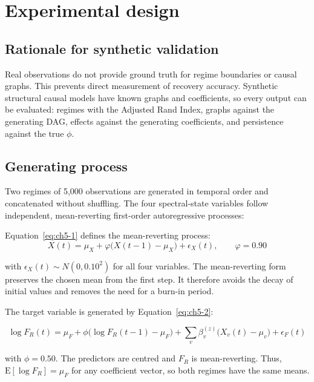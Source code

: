 

\section{Experimental design}


\subsection{Rationale for synthetic validation}

Real observations do not provide ground truth for regime boundaries or causal graphs.
This prevents direct measurement of recovery accuracy. Synthetic structural causal
models have known graphs and coefficients, so every output can be evaluated: regimes
with the Adjusted Rand Index, graphs against the generating DAG, effects against the
generating coefficients, and persistence against the true $\phi$.


\subsection{Generating process}

Two regimes of 5,000 observations are generated in temporal order and concatenated
without shuffling. The four spectral-state variables follow independent,
mean-reverting first-order autoregressive processes:

Equation~\eqref{eq:ch5-1} defines the mean-reverting process:
\begin{equation}
    \label{eq:ch5-1}
X(t) = \mu_X + \varphi\big(X(t-1) - \mu_X\big) + \epsilon_X(t), \qquad \varphi = 0.90
\end{equation}

with $\epsilon_X(t) \sim N(0, 0.10^2)$ for all four variables. The mean-reverting
form preserves the chosen mean from the first step. It therefore avoids the decay of
initial values and removes the need for a burn-in period.

The target variable is generated by Equation~\eqref{eq:ch5-2}:

\begin{equation}
    \label{eq:ch5-2}
\log F_R(t) = \mu_F + \phi\big(\log F_R(t-1) - \mu_F\big) + \sum_{v} \beta_v^{(z)}\big(X_v(t) - \mu_v\big) + \epsilon_F(t)
\end{equation}

with $\phi = 0.50$. The predictors are centred and $F_R$ is mean-reverting. Thus,
$\mathrm{E}[\log F_R] = \mu_F$ for any coefficient vector, so both regimes have the
same means.



